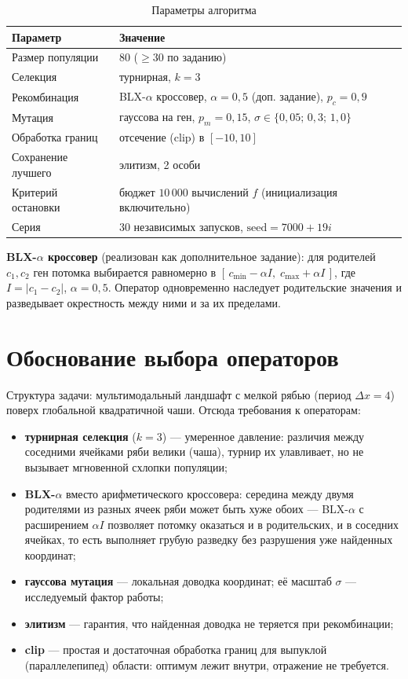 \documentclass[12pt,a4paper]{article}
\begin{document}
\begin{table}[H]
\centering
\small
\caption{Параметры алгоритма}
\label{tab:params}
\begin{tabular}{ll}
\toprule
Параметр & Значение \\
\midrule
Размер популяции & 80 ($\ge 30$ по заданию) \\
Селекция & турнирная, $k = 3$ \\
Рекомбинация & BLX-$\alpha$ кроссовер, $\alpha = 0{,}5$ (доп. задание), $p_c = 0{,}9$ \\
Мутация & гауссова на ген, $p_m = 0{,}15$, $\sigma \in \{0{,}05;\,0{,}3;\,1{,}0\}$ \\
Обработка границ & отсечение (clip) в $[-10, 10]$ \\
Сохранение лучшего & элитизм, 2 особи \\
Критерий остановки & бюджет $10\,000$ вычислений $f$ (инициализация включительно) \\
Серия & 30 независимых запусков, $\text{seed} = 7000 + 19i$ \\
\bottomrule
\end{tabular}
\end{table}

\textbf{BLX-$\alpha$ кроссовер} (реализован как дополнительное задание):
для родителей $c_1, c_2$ ген потомка выбирается равномерно в
$[\,c_{\min} - \alpha I,\; c_{\max} + \alpha I\,]$, где
$I = |c_1 - c_2|$, $\alpha = 0{,}5$. Оператор одновременно наследует
родительские значения и разведывает окрестность между ними и за их
пределами.

\section{Обоснование выбора операторов}

Структура задачи: мультимодальный ландшафт с мелкой рябью
(период $\Delta x = 4$) поверх глобальной квадратичной чаши. Отсюда
требования к операторам:
\begin{itemize}
\item \textbf{турнирная селекция} ($k = 3$) --- умеренное давление:
  различия между соседними ячейками ряби велики (чаша), турнир их
  улавливает, но не вызывает мгновенной схлопки популяции;
\item \textbf{BLX-$\alpha$} вместо арифметического кроссовера: середина
  между двумя родителями из разных ячеек ряби может быть хуже обоих ---
  BLX-$\alpha$ с расширением $\alpha I$ позволяет потомку оказаться и
  в родительских, и в соседних ячейках, то есть выполняет грубую
  разведку без разрушения уже найденных координат;
\item \textbf{гауссова мутация} --- локальная доводка координат; её
  масштаб $\sigma$ --- исследуемый фактор работы;
\item \textbf{элитизм} --- гарантия, что найденная доводка не теряется
  при рекомбинации;
\item \textbf{clip} --- простая и достаточная обработка границ для
  выпуклой (параллелепипед) области: оптимум лежит внутри, отражение
  не требуется.
\end{itemize}
\end{document}
